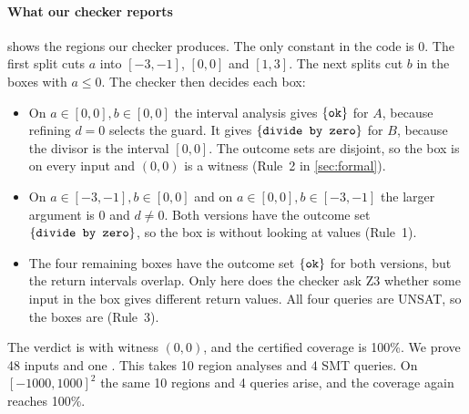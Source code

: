 \paragraph{What our checker reports}
 shows the regions our checker produces. The only constant in the code is
$0$. The first split cuts $a$ into $[-3,-1]$, $[0,0]$ and $[1,3]$. The next splits cut $b$ in
the boxes with $a \le 0$. The checker then decides each box:
\begin{itemize}
  \item On $a \in [0,0], b \in [0,0]$ the interval analysis gives $\left\{\texttt{ok}\right\}$ for $A$, because
        refining $d = 0$ selects the guard. It gives $\left\{\texttt{divide by zero}\right\}$ for $B$, because the divisor
        is the interval $[0,0]$. The outcome sets are disjoint, so the box is \chg{} on every
        input and $(0,0)$ is a witness (Rule~2 in \cref{sec:formal}).
  \item On $a \in [-3,-1], b \in [0,0]$ and on $a \in [0,0], b \in [-3,-1]$ the larger argument
        is $0$ and $d \neq 0$. Both versions have the outcome set $\left\{\texttt{divide by zero}\right\}$, so the box is
        \pres{} without looking at values (Rule~1).
  \item The four remaining boxes have the outcome set $\left\{\texttt{ok}\right\}$ for both versions, but the
        return intervals overlap. Only here does the checker ask Z3 whether some input in the
        box gives different return values. All four queries are UNSAT, so the boxes are
        \pres{} (Rule~3).
\end{itemize}
The verdict is \chg{} with witness $(0,0)$, and the certified coverage is 100\%. We prove 48
inputs \pres{} and one \chg{}. This takes 10 region analyses and 4 SMT queries. On
$[-1000,1000]^2$ the same 10 regions and 4 queries arise, and the coverage again reaches
100\%.

